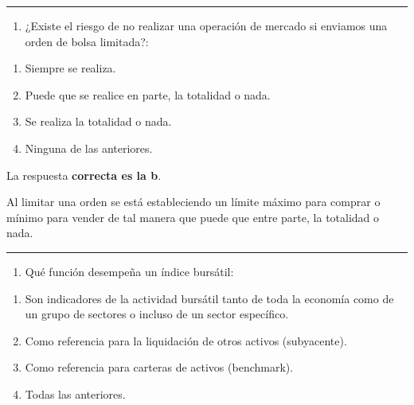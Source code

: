 \documentclass[
  letterpaper,
  DIV=11,
  numbers=noendperiod]{scrreprt}
\providecommand{\tightlist}{%
  \setlength{\itemsep}{0pt}\setlength{\parskip}{0pt}}\usepackage{longtable,booktabs,array}
\begin{document}
\begin{center}\rule{0.5\linewidth}{0.5pt}\end{center}

\begin{enumerate}
\def\labelenumi{\arabic{enumi}.}
\setcounter{enumi}{25}
\tightlist
\item
  ¿Existe el riesgo de no realizar una operación de mercado si enviamos
  una orden de bolsa limitada?:
\end{enumerate}

\begin{enumerate}
\def\labelenumi{\alph{enumi})}
\item
  Siempre se realiza.
\item
  Puede que se realice en parte, la totalidad o nada.
\item
  Se realiza la totalidad o nada.
\item
  Ninguna de las anteriores.
\end{enumerate}

\begin{tcolorbox}[enhanced jigsaw, left=2mm, opacityback=0, colback=white, breakable, arc=.35mm, bottomrule=.15mm, rightrule=.15mm, toprule=.15mm, leftrule=.75mm, colframe=quarto-callout-tip-color-frame]
\begin{minipage}[t]{5.5mm}
\textcolor{quarto-callout-tip-color}{\faLightbulb}
\end{minipage}%
\begin{minipage}[t]{\textwidth - 5.5mm}

La respuesta \textbf{correcta es la b}.

Al limitar una orden se está estableciendo un límite máximo para comprar
o mínimo para vender de tal manera que puede que entre parte, la
totalidad o nada.

\end{minipage}%
\end{tcolorbox}

\begin{center}\rule{0.5\linewidth}{0.5pt}\end{center}

\begin{enumerate}
\def\labelenumi{\arabic{enumi}.}
\setcounter{enumi}{26}
\tightlist
\item
  Qué función desempeña un índice bursátil:
\end{enumerate}

\begin{enumerate}
\def\labelenumi{\alph{enumi})}
\item
  Son indicadores de la actividad bursátil tanto de toda la economía
  como de un grupo de sectores o incluso de un sector específico.
\item
  Como referencia para la liquidación de otros activos (subyacente).
\item
  Como referencia para carteras de activos (benchmark).
\item
  Todas las anteriores.
\end{enumerate}
\end{document}

